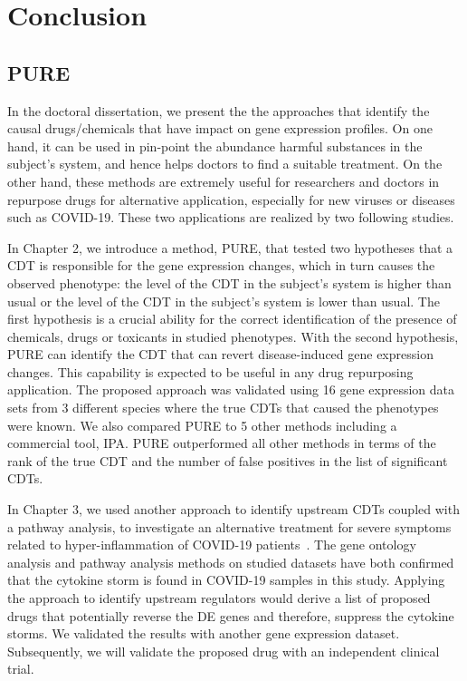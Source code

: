 \section{Conclusion}
\label{chap:Conclusion}

\subsection{PURE}

In the doctoral dissertation, we present the the approaches that identify the causal drugs/chemicals that have impact on gene expression profiles. On one hand, it can be used in pin-point the abundance harmful substances in the subject's system, and hence helps doctors to find a suitable treatment. On the other hand, these methods are extremely useful for researchers and doctors in repurpose drugs for alternative application, especially for new viruses or diseases such as COVID-19. These two applications are realized by two following studies.

In Chapter 2, we introduce a method, PURE, that tested two hypotheses that a CDT is responsible for the gene expression changes, which in turn causes the observed phenotype: the level of the CDT in the subject's system is higher than usual or the level of the CDT in the subject's system is lower than usual. The first hypothesis is a crucial ability for the correct identification of the presence of chemicals, drugs or toxicants in studied phenotypes.  With the second hypothesis, PURE can identify the CDT that can revert disease-induced gene expression changes. This capability is expected to be useful in any drug repurposing application. 
The proposed approach was validated using 16 gene expression data sets from 3 different species where the true CDTs that caused the phenotypes were known. We also compared PURE to 5 other methods including a commercial tool, IPA. PURE outperformed all other methods in terms of the rank of the true CDT and the number of false positives in the list of significant CDTs.

In Chapter 3, we used another approach to identify upstream CDTs coupled with a pathway analysis, to investigate an alternative treatment for severe symptoms related to hyper-inflammation of COVID-19 patients~\cite{DraghiciCOVID:2021}. The gene ontology analysis and pathway analysis methods on studied datasets have both confirmed that the cytokine storm is found in COVID-19 samples in this study. Applying the approach to identify upstream regulators would derive a list of proposed drugs that potentially reverse the DE genes and therefore, suppress the cytokine storms. We validated the results with another gene expression dataset. Subsequently, we will validate the proposed drug with an independent clinical trial.